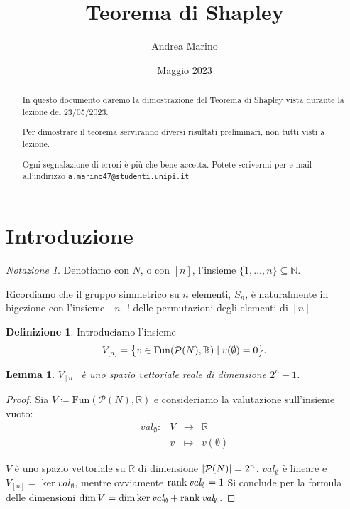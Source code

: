 \documentclass[a4paper,11pt]{article}
\title{Teorema di Shapley}
\author{Andrea Marino}
\date{Maggio 2023}
\theoremstyle{definition}				%
\newtheorem{definizione}{Definizione}%
\theoremstyle{remark}
\newtheorem*{notazione}{Notazione}
\theoremstyle{plain}
\newtheorem{lemma}{Lemma}%
\newcommand{\R}{\mathbb{R}}										%
\begin{document}
	\maketitle

	\begin{abstract}
		In questo documento daremo la dimostrazione del Teorema di Shapley vista durante la lezione del 23/05/2023.
		
		Per dimostrare il teorema serviranno diversi risultati preliminari, non tutti visti a lezione.
		\smallskip

		Ogni segnalazione di errori è più che bene accetta. Potete scrivermi per e-mail all'indirizzo 
		\texttt{a.marino47@studenti.unipi.it}
	\end{abstract}
	
	\section*{Introduzione}
	\begin{notazione}
		Denotiamo con $N$, o con $[n]$, l'insieme $\{1,\dots,n\}\subseteq\mathbb{N}$.
		
		Ricordiamo che il gruppo simmetrico su $n$ elementi, $S_n$, è naturalmente in bigezione con l'insieme $[n]!$ delle permutazioni degli elementi di $[n]$.
	\end{notazione}
	
	\begin{definizione}
		Introduciamo l'insieme 
		\[
			V_{[n]}=\qty\big{v\in\mathrm{Fun}\qty(\mathcal{P}(N),\R)\mid v(\emptyset)=0}.
		\]
	\end{definizione}
	
	\begin{lemma}\label{lemma:vectorspace}
		$V_{[n]}$ è uno spazio vettoriale reale di dimensione $2^n-1$.
	\end{lemma}
	\begin{proof}
		Sia $V\coloneqq\mathrm{Fun}\left(\mathcal{P}(N),\R\right)$ e consideriamo la valutazione sull'insieme vuoto: 
		\[
			\begin{array}{rccl}
				\mathit{val}_{\emptyset}\colon	& V	& \longrightarrow & \R\\
				 & v & \longmapsto & v\left(\emptyset\right)
			\end{array}	
		\]
		
		$V$ è uno spazio vettoriale su $\R$ di dimensione $\qty|\mathcal{P}(N)|=2^n$. $\mathit{val}_{\emptyset}$ è lineare e $V_{[n]}=\ker\textit{val}_{\emptyset}$, mentre ovviamente $\rank \textit{val}_{\emptyset}=1$ Si conclude per la formula delle dimensioni $\dim V = \dim\ker\textit{val}_{\emptyset}+\rank\textit{val}_{\emptyset}$.
	\end{proof}
	
\end{document}
